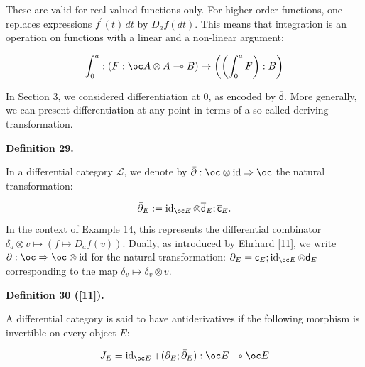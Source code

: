  
These are valid for real-valued functions only. For higher-order functions, one replaces expressions $f^{\prime}(t)\,dt$ by $D_{a}f(dt)$. This means that integration is an operation on functions with a linear and a non-linear argument:\par
    \[\int_{0}^{a}:(F:\oc A\otimes A\multimap B)\mapsto\left(\left(\int_{0}^{a}F\right):B\right)\]    
 
 
In Section 3, we considered differentiation at $0$, as encoded by $\overline{\mathsf{d}}$. More generally, we can present differentiation at any point in terms of a so-called deriving transformation.\par
 
 
 
\par\medskip\noindent\textbf{Definition 29.}\par
 
 
In a differential category $\mathscr{L}$, we denote by $\bar{\partial}:\oc\otimes\operatorname{id}\Rightarrow\oc$ the natural transformation:\par
    \[\bar{\partial}_{E}:=\operatorname{id}_{\oc E}\otimes\overline{\mathsf{d}}_{E};\overline{\mathsf{c}}_{E}.\]    
In the context of Example 14, this represents the differential combinator $\delta_{a}\otimes v\mapsto(f\mapsto D_{a}f(v))$. Dually, as introduced by Ehrhard [11], we write ${\partial}:\oc\Rightarrow\oc\otimes\operatorname{id}$ for the natural transformation: ${\partial}_{E}={\mathsf{c}}_{E};\operatorname{id}_{\oc E}\otimes{\mathsf{d}}_{E}$ corresponding to the map $\delta_{v}\mapsto\delta_{v}\otimes v$.\par
 
 
 
 
\par\medskip\noindent\textbf{Definition 30 ([11]).}\par
 
 
A differential category is said to have antiderivatives if the following morphism is invertible on every object $E$:\par
    \[J_{E}=\operatorname{id}_{\oc E}+({\partial}_{E};\bar{\partial}_{E}):\oc E\multimap\oc E\]    
 
